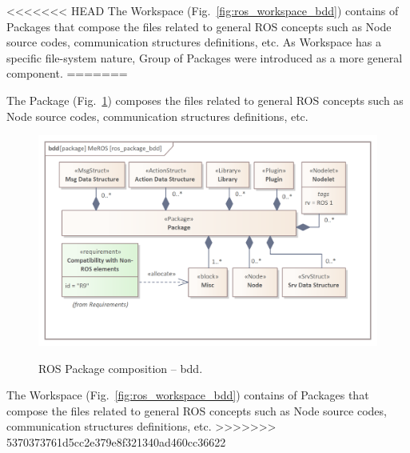 \documentclass[11pt,oneside,a4paper]{article}
\begin{document}
	\pagebreak
	
<<<<<<< HEAD
	The Workspace (Fig.~\ref{fig:ros_workspace_bdd}) contains of Packages that compose the files related to general ROS concepts such as Node source codes, communication structures definitions, etc. As Workspace has a specific file-system nature, Group of Packages were introduced as a more general component.
=======
	
	The Package (Fig.~\ref{fig:ros_package_bdd}) composes the files related to general ROS concepts such as Node source codes, communication structures definitions, etc. 
	
	
	\begin{figure}[H]
		\centering
		\begin{center}
			{\includegraphics[scale=1.0]{img/meros_pkg/ros_package_bdd.png}}
		\end{center}
		\caption{ROS Package composition -- bdd.} 
		\label{fig:ros_package_bdd}
	\end{figure}
		
	
	
	The Workspace (Fig.~\ref{fig:ros_workspace_bdd}) contains of Packages that compose the files related to general ROS concepts such as Node source codes, communication structures definitions, etc. 
>>>>>>> 5370373761d5cc2e379e8f321340ad460cc36622
	
\end{document}
